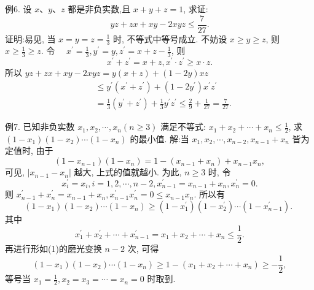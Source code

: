 例6. 设 $x 、 y 、 z$ 都是非负实数,且 $x+y+z=1$, 求证:
$$
y z+z x+x y-2 x y z \leqslant \frac{7}{27} .
$$
证明:易见, 当 $x=y=z=\frac{1}{3}$ 时, 不等式中等号成立.
不妨设 $x \geqslant y \geqslant z$, 则 $x \geqslant \frac{1}{3} \geqslant z$.
令 $\quad x^{\prime}=\frac{1}{3}, y^{\prime}=y, z^{\prime}=x+z-\frac{1}{3}$,
则
$$
x^{\prime}+z^{\prime}=x+z, x^{\prime} \cdot z^{\prime} \geqslant x \cdot z .
$$
所以 $y z+z x+x y-2 x y z=y(x+z)+(1-2 y) x z$
$$
\begin{aligned}
& \leqslant y^{\prime}\left(x^{\prime}+z^{\prime}\right)+\left(1-2 y^{\prime}\right) x^{\prime} z^{\prime} \\
& =\frac{1}{3}\left(y^{\prime}+z^{\prime}\right)+\frac{1}{3} y^{\prime} z^{\prime} \leqslant \frac{2}{9}+\frac{1}{27}=\frac{7}{27} .
\end{aligned}
$$



例7. 已知非负实数 $x_1, x_2, \cdots, x_n(n \geqslant 3)$ 满足不等式: $x_1+x_2+\cdots+ x_n \leqslant \frac{1}{2}$, 求 $\left(1-x_1\right)\left(1-x_2\right) \cdots\left(1-x_n\right)$ 的最小值.
解:当 $x_1, x_2, \cdots, x_{n-2}, x_{n-1}+x_n$ 皆为定值时, 由于
$$
\left(1-x_{n-1}\right)\left(1-x_n\right)=1-\left(x_{n-1}+x_n\right)+x_{n-1} x_n,
$$
可见, $\left|x_{n-1}-x_n\right|$ 越大, 上式的值就越小.
为此, $n \geqslant 3$ 时, 令
$$
x_i^{\prime}=x_i, i=1,2, \cdots, n-2, x_{n-1}^{\prime}=x_{n-1}+x_n, x_n^{\prime}=0 . \label{(1)}
$$
则 $x_{n-1}^{\prime}+x_n^{\prime}=x_{n-1}+x_n, x_{n-1}^{\prime} x_n^{\prime}=0 \leqslant x_{n-1} x_n$. 所以有
$$
\left(1-x_1\right)\left(1-x_2\right) \cdots\left(1-x_n\right) \geqslant\left(1-x_1^{\prime}\right)\left(1-x_2^{\prime}\right) \cdots\left(1-x_{n-1}^{\prime}\right) \text {. }
$$
其中
$$
x_1^{\prime}+x_2^{\prime}+\cdots+x_{n-1}^{\prime}=x_1+x_2+\cdots+x_n \leqslant \frac{1}{2} .
$$
再进行形如(1)的磨光变换 $n-2$ 次, 可得
$$
\left(1-x_1\right)\left(1-x_2\right) \cdots\left(1-x_n\right) \geqslant 1-\left(x_1+x_2+\cdots+x_n\right) \geqslant-\frac{1}{2},
$$
等号当 $x_1=\frac{1}{2}, x_2=x_3=\cdots=x_n=0$ 时取到.




